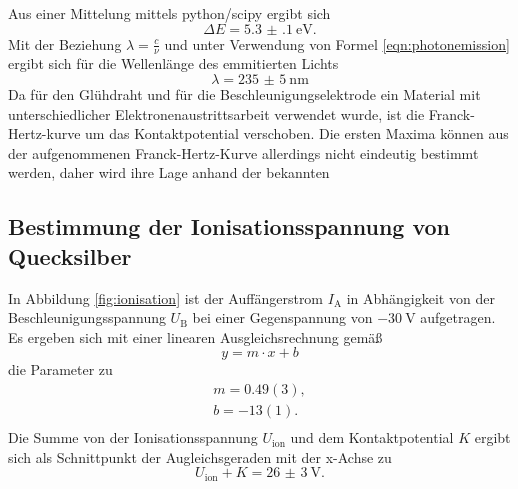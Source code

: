 Aus einer Mittelung mittels python/scipy \cite{scipy} ergibt sich
\begin{equation}
	\Delta E=\SI{5.3(1)}{\electronvolt} \mathrm{.}
\end{equation}
Mit der Beziehung $\lambda=\frac{c}{\nu}$ und unter Verwendung von Formel
\eqref{eqn:photonemission} ergibt sich für die Wellenlänge des emmitierten Lichts
\begin{equation}
	\lambda=\SI{235(5)}{\nano\meter}
\end{equation}
Da für den Glühdraht und für die Beschleunigungselektrode ein Material mit unterschiedlicher Elektronenaustrittsarbeit verwendet wurde, ist die Franck-Hertz-kurve um das Kontaktpotential verschoben.
Die ersten Maxima können aus der aufgenommenen Franck-Hertz-Kurve allerdings nicht eindeutig bestimmt werden, daher wird ihre Lage anhand der bekannten

\FloatBarrier
\subsection{Bestimmung der Ionisationsspannung von Quecksilber}
In Abbildung \ref{fig:ionisation} ist der Auffängerstrom $I_{\mathrm{A}}$ in Abhängigkeit
von der Beschleunigungsspannung $U_{\mathrm{B}}$ bei einer Gegenspannung von $-\SI{30}{\volt}$
aufgetragen.
Es ergeben sich mit einer linearen Ausgleichsrechnung gemäß
\begin{equation*}
	y = m \cdot x + b
\end{equation*}
die Parameter zu
\begin{gather*}
	m = 0.49(3) \mathrm{,} \\
	b = -13(1) \mathrm{.}  \\
\end{gather*}
Die Summe von der Ionisationsspannung $U_{\mathrm{ion}}$ und dem Kontaktpotential $K$ ergibt 
sich als Schnittpunkt der Augleichsgeraden mit der x-Achse zu
\begin{equation*}
	U_{\mathrm{ion}} + K = \SI{26(3)}{\volt} \mathrm{.}
\end{equation*}
